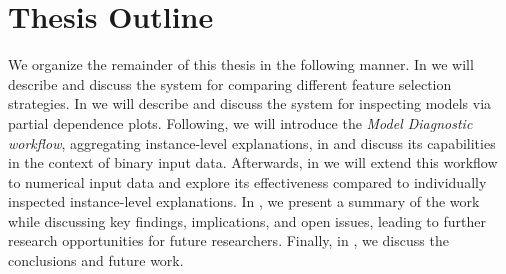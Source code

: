\section{Thesis Outline}
\label{sec:thesisoutline}
We organize the remainder of this thesis in the following manner.
In  we will describe and discuss the \infuse system for comparing different feature selection strategies.
In  we will describe and discuss the \prospector system for inspecting models via partial dependence plots.
Following, we will introduce the \emph{Model Diagnostic workflow}, aggregating instance-level explanations, in  and discuss its capabilities in the context of binary input data.
Afterwards, in  we will extend this workflow to numerical input data and explore its effectiveness compared to individually inspected instance-level explanations.
In , we present a summary of the work while discussing key findings, implications, and open issues, leading to further research opportunities for future researchers.
Finally, in , we discuss the conclusions and future work.